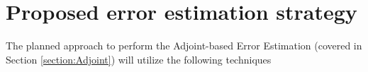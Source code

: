 \documentclass[titlepage,11pt,letterpaper]{article}
\numberwithin{equation}{subsection}
\begin{document}
\thispagestyle{empty}\titleRR
\clearpage
\setcounter{page}{1}


\newpage


\section{Proposed error estimation strategy}

The planned approach to perform the Adjoint-based Error Estimation (covered in Section \ref{section:Adjoint}) will utilize the following techniques















\end{document}
